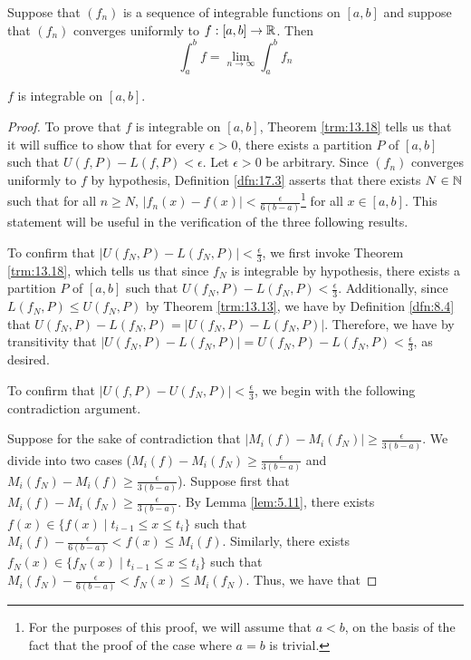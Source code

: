 \documentclass[../main.tex]{subfiles}
\begin{document}
\begin{theorem}\label{trm:17.7}
    Suppose that $(f_n)$ is a sequence of integrable functions on $[a,b]$ and suppose that $(f_n)$ converges uniformly to $f:[a,b]\to\mathbb{R}$. Then
    \begin{equation*}
        \int_a^bf = \lim_{n\to\infty}\int_a^bf_n
    \end{equation*}
    \begin{lemma*}
        $f$ is integrable on $[a,b]$.
        \begin{proof}
            To prove that $f$ is integrable on $[a,b]$, Theorem \ref{trm:13.18} tells us that it will suffice to show that for every $\epsilon>0$, there exists a partition $P$ of $[a,b]$ such that $U(f,P)-L(f,P)<\epsilon$. Let $\epsilon>0$ be arbitrary. Since $(f_n)$ converges uniformly to $f$ by hypothesis, Definition \ref{dfn:17.3} asserts that there exists $N\in\mathbb{N}$ such that for all $n\geq N$, $|f_n(x)-f(x)|<\frac{\epsilon}{6(b-a)}$\footnote{For the purposes of this proof, we will assume that $a<b$, on the basis of the fact that the proof of the case where $a=b$ is trivial.} for all $x\in[a,b]$. This statement will be useful in the verification of the three following results.\par\medskip
            To confirm that $|U(f_N,P)-L(f_N,P)|<\frac{\epsilon}{3}$, we first invoke Theorem \ref{trm:13.18}, which tells us that since $f_N$ is integrable by hypothesis, there exists a partition $P$ of $[a,b]$ such that $U(f_N,P)-L(f_N,P)<\frac{\epsilon}{3}$. Additionally, since $L(f_N,P)\leq U(f_N,P)$ by Theorem \ref{trm:13.13}, we have by Definition \ref{dfn:8.4} that $U(f_N,P)-L(f_N,P)=|U(f_N,P)-L(f_N,P)|$. Therefore, we have by transitivity that $|U(f_N,P)-L(f_N,P)|=U(f_N,P)-L(f_N,P)<\frac{\epsilon}{3}$, as desired.\par\medskip
            To confirm that $|U(f,P)-U(f_N,P)|<\frac{\epsilon}{3}$, we begin with the following contradiction argument.\par
            Suppose for the sake of contradiction that $|M_i(f)-M_i(f_N)|\geq\frac{\epsilon}{3(b-a)}$. We divide into two cases ($M_i(f)-M_i(f_N)\geq\frac{\epsilon}{3(b-a)}$ and $M_i(f_N)-M_i(f)\geq\frac{\epsilon}{3(b-a)}$). Suppose first that $M_i(f)-M_i(f_N)\geq\frac{\epsilon}{3(b-a)}$. By Lemma \ref{lem:5.11}, there exists $f(x)\in\{f(x)\mid t_{i-1}\leq x\leq t_i\}$ such that $M_i(f)-\frac{\epsilon}{6(b-a)}<f(x)\leq M_i(f)$. Similarly, there exists $f_N(x)\in\{f_N(x)\mid t_{i-1}\leq x\leq t_i\}$ such that $M_i(f_N)-\frac{\epsilon}{6(b-a)}<f_N(x)\leq M_i(f_N)$. Thus, we have that

\end{proof}
\end{lemma*}
\end{theorem}
\end{document}
